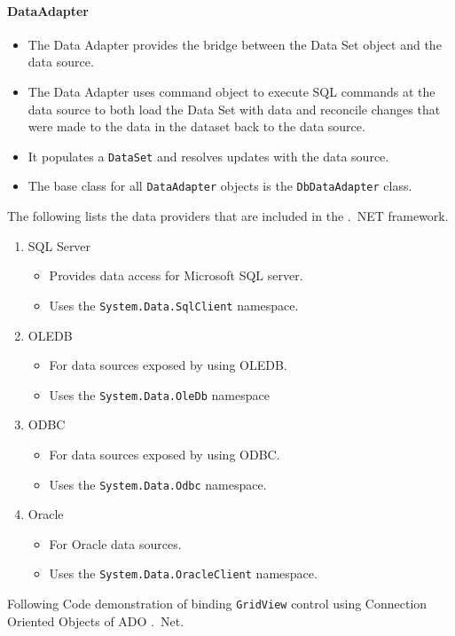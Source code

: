 \paragraph*{DataAdapter}
\begin{itemize}
	\item The Data Adapter provides the bridge between the Data Set object and the data source.
	\item The Data Adapter uses command object to execute SQL commands at the data source to both load the Data Set with data and reconcile changes that were made to the data in the dataset back
	to the data source.
	\item It populates a \texttt{DataSet} and resolves updates with the data source.
	\item The base class for all \texttt{DataAdapter} objects is the \texttt{DbDataAdapter} class.
\end{itemize}

\noindent The following lists the data providers that are included in the .\ NET framework.

\begin{enumerate}
	\item SQL Server
		\begin{itemize}
			\item Provides data access for Microsoft SQL server.
			\item Uses the \texttt{System.Data.SqlClient} namespace.
		\end{itemize}
	\item OLEDB
		\begin{itemize}
			\item For data sources exposed by using OLEDB.
			\item Uses the \texttt{System.Data.OleDb} namespace
		\end{itemize}
	\item ODBC
		\begin{itemize}
			\item For data sources exposed by using ODBC.
			\item Uses the \texttt{System.Data.Odbc} namespace.
		\end{itemize}
	\item Oracle
	\begin{itemize}
		\item For Oracle data sources.
		\item Uses the \texttt{System.Data.OracleClient} namespace.
	\end{itemize}
\end{enumerate}
Following Code demonstration of binding \texttt{GridView} control using Connection Oriented Objects of ADO .\ Net.

